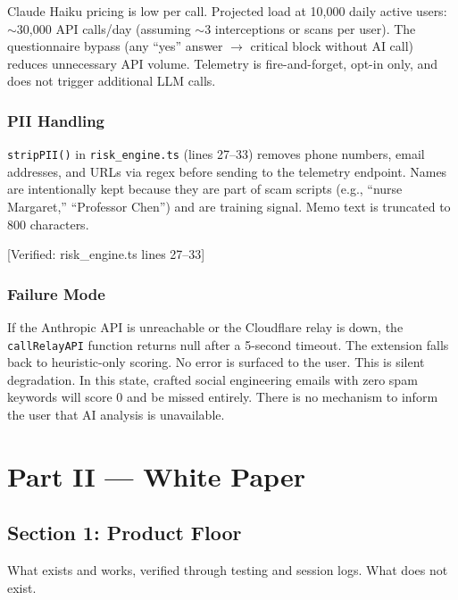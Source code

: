 \documentclass[11pt, letterpaper]{article}
\newcommand{\verified}[1]{\textcolor{citation}{[Verified: #1]}}
\begin{document}
  Claude Haiku pricing is low per call. Projected load at 10,000 daily active users: $\sim$30,000 API calls/day (assuming $\sim$3 interceptions or scans per user). The questionnaire bypass (any ``yes'' answer $\rightarrow$ critical block without AI call) reduces unnecessary API volume. Telemetry is fire-and-forget, opt-in only, and does not trigger additional LLM calls.

  \subsubsection{PII Handling}

  \texttt{stripPII()} in \texttt{risk\_engine.ts} (lines 27--33) removes phone numbers, email addresses, and URLs via regex before sending to the telemetry endpoint. Names are intentionally kept because they are part of scam scripts (e.g., ``nurse Margaret,'' ``Professor Chen'') and are training signal. Memo text is truncated to 800 characters.

  \verified{risk\_engine.ts lines 27--33}

  \subsubsection{Failure Mode}

  If the Anthropic API is unreachable or the Cloudflare relay is down, the \texttt{callRelayAPI} function returns null after a 5-second timeout. The extension falls back to heuristic-only scoring. No error is surfaced to the user. This is silent degradation. In this state, crafted social engineering emails with zero spam keywords will score 0 and be missed entirely. There is no mechanism to inform the user that AI analysis is unavailable.

  \newpage

  \section*{Part II --- White Paper}

  \subsection{Section 1: Product Floor}

  What exists and works, verified through testing and session logs. What does not exist.
\end{document}
